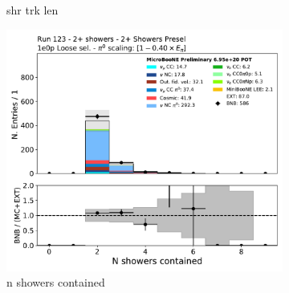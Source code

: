 \begin{figure}[H]
\begin{subfigure}{0.3\textwidth}
    \caption{shr trk len}
    \end{subfigure}
    \begin{subfigure}{0.3\textwidth}
    \includegraphics[width=1.0\textwidth]{Sidebands/Figures/TwoShr_1e0pSel/loose/n_showers_contained.pdf}
    \caption{n showers contained}
    \end{subfigure}
    \caption{} 
    \label{fig:HE_1eNp_1}
\end{figure}

